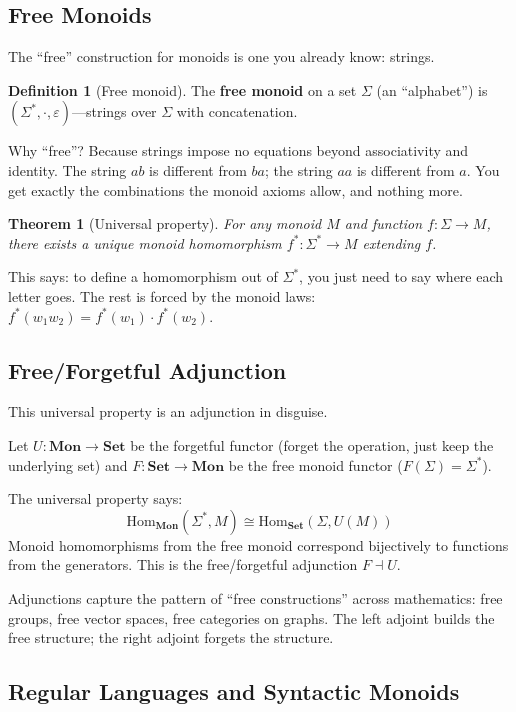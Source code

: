 \documentclass[11pt]{article}
\newcommand{\cat}[1]{\mathbf{#1}}
\newcommand{\Set}{\cat{Set}}
\newcommand{\Hom}{\mathrm{Hom}}
\theoremstyle{definition}
\newtheorem{definition}{Definition}[section]
\theoremstyle{plain}
\newtheorem{theorem}{Theorem}[section]
\theoremstyle{remark}
\begin{document}
\subsection{Free Monoids}

The ``free'' construction for monoids is one you already know: strings.

\begin{definition}[Free monoid]
The \textbf{free monoid} on a set $\Sigma$ (an ``alphabet'') is $(\Sigma^*, \cdot, \varepsilon)$---strings over $\Sigma$ with concatenation.
\end{definition}

Why ``free''? Because strings impose no equations beyond associativity and identity. The string $ab$ is different from $ba$; the string $aa$ is different from $a$. You get exactly the combinations the monoid axioms allow, and nothing more.

\begin{theorem}[Universal property]
For any monoid $M$ and function $f: \Sigma \to M$, there exists a unique monoid homomorphism $f^*: \Sigma^* \to M$ extending $f$.
\end{theorem}

This says: to define a homomorphism out of $\Sigma^*$, you just need to say where each letter goes. The rest is forced by the monoid laws: $f^*(w_1 w_2) = f^*(w_1) \cdot f^*(w_2)$.

\subsection{Free/Forgetful Adjunction}

This universal property is an adjunction in disguise.

Let $U: \cat{Mon} \to \Set$ be the forgetful functor (forget the operation, just keep the underlying set) and $F: \Set \to \cat{Mon}$ be the free monoid functor ($F(\Sigma) = \Sigma^*$).

The universal property says:
\[
\Hom_{\cat{Mon}}(\Sigma^*, M) \cong \Hom_{\Set}(\Sigma, U(M))
\]
Monoid homomorphisms from the free monoid correspond bijectively to functions from the generators. This is the free/forgetful adjunction $F \dashv U$.

Adjunctions capture the pattern of ``free constructions'' across mathematics: free groups, free vector spaces, free categories on graphs. The left adjoint builds the free structure; the right adjoint forgets the structure.

\subsection{Regular Languages and Syntactic Monoids}
\end{document}

